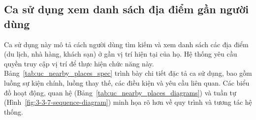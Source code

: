 \subsection{Ca sử dụng xem danh sách địa điểm gần người dùng}
\noindent Ca sử dụng này mô tả cách người dùng tìm kiếm và xem danh sách các địa điểm (du lịch, nhà hàng, khách sạn) ở gần vị trí hiện tại của họ. Hệ thống yêu cầu quyền truy cập vị trí để thực hiện chức năng này. Bảng~\ref{tab:uc_nearby_places_spec} trình bày chi tiết đặc tả ca sử dụng, bao gồm luồng sự kiện chính, luồng thay thế, các điều kiện và yêu cầu liên quan. Các biểu đồ hoạt động, quan hệ (Bảng~\ref{tab:uc_nearby_places_diagrams}) và tuần tự (Hình~\ref{fig:3-3-7-sequence-diagram}) minh họa rõ hơn về quy trình và tương tác hệ thống.

